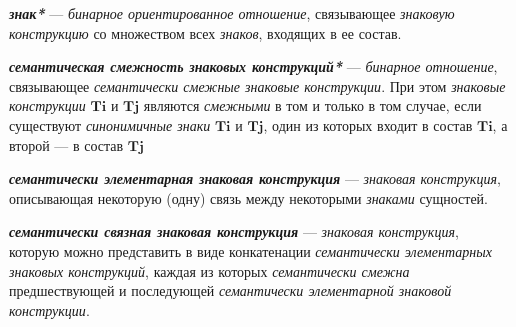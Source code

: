 \textbf{\textit{знак*}} --- \textit{бинарное ориентированное отношение}, связывающее \textit{знаковую конструкцию} со множеством всех \textit{знаков}, входящих в ее состав.

\textbf{\textit{семантическая смежность знаковых конструкций*}} --- \textit{бинарное отношение}, связывающее \textit{семантически смежные знаковые конструкции}.
При этом \textit{знаковые конструкции} \textit{$\bm{Ti}$} и \textit{$\bm{Tj}$} являются \textit{смежными} в том и только в том случае, если существуют \textit{синонимичные знаки} \textit{$\bm{Ti}$} и \textit{$\bm{Tj}$}, один из которых входит в состав \textit{$\bm{Ti}$}, а второй --- в состав \textit{$\bm{Tj}$}

\begin{SCn}


\end{SCn}

\textbf{\textit{семантически элементарная знаковая конструкция}} --- \textit{знаковая конструкция}, описывающая некоторую (одну) связь между некоторыми \textit{знаками} сущностей.

\textbf{\textit{семантически связная знаковая конструкция}} --- \textit{знаковая конструкция}, которую можно представить в виде конкатенации \textit{семантически элементарных знаковых конструкций}, каждая из которых \textit{семантически смежна} предшествующей и последующей \textit{семантически элементарной знаковой конструкции}.

\begin{SCn}

    \begin{scnindent}
    \end{scnindent}
    \begin{scnindent}
    \end{scnindent}

\end{SCn}


